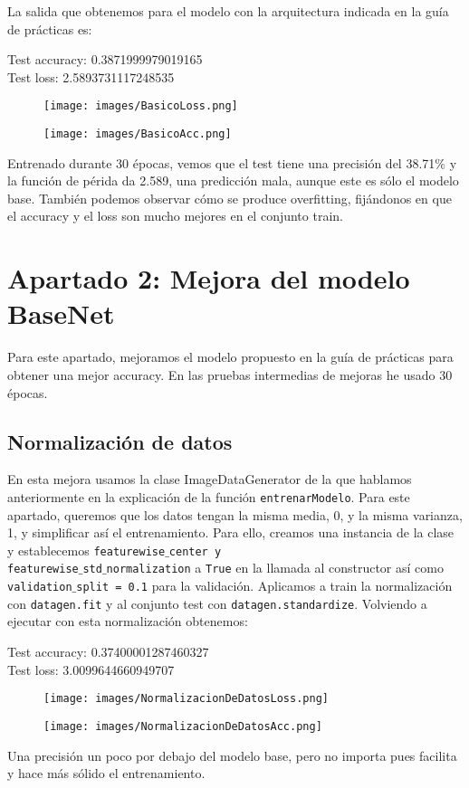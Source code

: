 \documentclass[12pt]{article}
\begin{document}
La salida que obtenemos para el modelo con la arquitectura indicada en la guía de prácticas es: 
\begin{center}
Test accuracy: 0.3871999979019165\\
Test loss: 2.5893731117248535
\end{center}
\begin{figure}[H]
\centering
\parbox{8cm}{
\texttt{[image: images/BasicoLoss.png]}
\caption{}
\label{fig:2figsA}}
\begin{minipage}{8cm}
\texttt{[image: images/BasicoAcc.png]}
\caption{}
\label{fig:2figsB}
\end{minipage}
\end{figure}
Entrenado durante 30 épocas, vemos que el test tiene una precisión del 38.71$\%$ y la función de périda da 2.589, una predicción mala, aunque este es sólo el modelo base. También podemos observar cómo se produce overfitting, fijándonos en que el accuracy y el loss son mucho mejores en el conjunto train.


\section*{Apartado 2: Mejora del modelo BaseNet}
Para este apartado, mejoramos el modelo propuesto en la guía de prácticas para obtener una mejor accuracy. En las pruebas intermedias de mejoras he usado 30 épocas.

\subsection*{Normalización de datos}
En esta mejora usamos la clase ImageDataGenerator de la que hablamos anteriormente en la explicación de la función \texttt{entrenarModelo}. Para este apartado, queremos que los datos tengan la misma media, 0, y la misma varianza, 1, y simplificar así el entrenamiento. Para ello, creamos una instancia de la clase y establecemos \texttt{featurewise$\_$center y\\ featurewise$\_$std$\_$normalization} a \texttt{True} en la llamada al constructor así como\\ \texttt{validation$\_$split = 0.1} para la validación.
Aplicamos a train la normalización con \texttt{datagen.fit} y al conjunto test con \texttt{datagen.standardize}. Volviendo a ejecutar con esta normalización obtenemos:\\
\begin{center}
Test accuracy: 0.37400001287460327\\
Test loss: 3.0099644660949707
\end{center}
\begin{figure}[H]
\centering
\parbox{8cm}{
\texttt{[image: images/NormalizacionDeDatosLoss.png]}
\caption{}
\label{fig:2figsA}}
\begin{minipage}{8cm}
\texttt{[image: images/NormalizacionDeDatosAcc.png]}
\caption{}
\label{fig:2figsB}
\end{minipage}
\end{figure}
Una precisión un poco por debajo del modelo base, pero no importa pues facilita y hace más sólido el entrenamiento.
\end{document}
